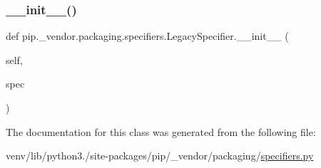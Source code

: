 \subsubsection{\texorpdfstring{\+\_\+\+\_\+init\+\_\+\+\_\+()}{\_\_init\_\_()}}
{\footnotesize\ttfamily def pip.\+\_\+vendor.\+packaging.\+specifiers.\+Legacy\+Specifier.\+\_\+\+\_\+init\+\_\+\+\_\+ (\begin{DoxyParamCaption}\item[{}]{self,  }\item[{}]{spec }\end{DoxyParamCaption})}



The documentation for this class was generated from the following file\+:\begin{DoxyCompactItemize}
\item 
venv/lib/python3./site-\/packages/pip/\+\_\+vendor/packaging/\hyperlink{pip_2__vendor_2packaging_2specifiers_8py}{specifiers.\+py}\end{DoxyCompactItemize}
